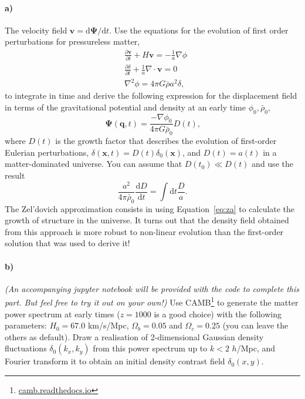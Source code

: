 \documentclass[12pt]{article}
\newcommand\diff{\mathrm{d}}
\begin{document}
\paragraph{a)} The velocity field $\mathbf{v} = \diff\mathbf{\Psi}/\diff t$. Use
the equations for the evolution of first order perturbations for pressureless
matter,
\begin{equation}
\begin{aligned}
    &\frac{\partial \mathbf{v}}{\partial t} + H \mathbf{v} = - \frac{1}{a} \nabla \phi \\
    &\frac{\partial \delta}{\partial t} + \frac{1}{a} \nabla \cdot \mathbf{v} = 0\\
    &\nabla^2 \phi = 4 \pi G \bar{\rho} a^2 \delta \text{,}
\end{aligned}
\label{eq:first-order}
\end{equation}
to integrate in time and derive the following expression for the displacement
field in terms of the gravitational potential and density at an early time
$\phi_0, \bar{\rho}_0$,
\begin{equation}
    \mathbf{\Psi}(\mathbf{q}, t) = \frac{-\nabla \phi_0}{4 \pi G \bar{\rho}_0} D(t)
    \text{,}
\label{eq:za}
\end{equation}
where $D(t)$ is the growth factor that describes the evolution of first-order
Eulerian perturbations, $\delta(\mathbf{x}, t) = D(t) \delta_0(\mathbf{x})$, and
$D(t) = a(t)$ in a matter-dominated universe. You can assume that $D(t_0) \ll
D(t)$ and use the result
\begin{equation}
    \frac{a^2}{4 \pi \bar{\rho}_0} \frac{\diff D}{\diff t} = \int \diff t \frac{D}{a} \text{.}
\end{equation}
The Zel'dovich approximation consists in using Equation~\ref{eq:za} to calculate
the growth of structure in the universe. It turns out that the density field
obtained from this approach is more robust to non-linear evolution than the
first-order solution that was used to derive it!

\paragraph{b)} \emph{(An accompanying jupyter notebook will be provided with the
code to complete this part. But feel free to try it out on your own!)} Use
CAMB\footnote{\url{camb.readthedocs.io}} to generate the matter power spectrum
at early times ($z=1000$ is a good choice) with the following parameters: $H_0 =
67.0$ km/s/Mpc, $\Omega_b = 0.05$ and $\Omega_c = 0.25$ (you can leave the
others as default). Draw a realisation of 2-dimensional Gaussian density
fluctuations $\delta_0(k_x, k_y)$ from this power spectrum up to $k < 2$
$h$/Mpc, and Fourier transform it to obtain an initial density contrast field
$\delta_0(x, y)$.
\end{document}
